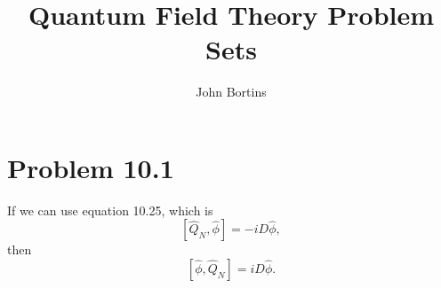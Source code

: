 \documentclass{article}
\title{Quantum Field Theory Problem Sets}
\author{John Bortins}
\begin{document}
 
\maketitle{}
 
\section*{Problem 10.1}
If we can use equation 10.25, which is \[[\hat{Q}_{N},\hat{\phi}]=-iD\hat{\phi},\] then \[[\hat{\phi},\hat{Q}_{N}]=iD\hat{\phi}.\]
\end{document}
